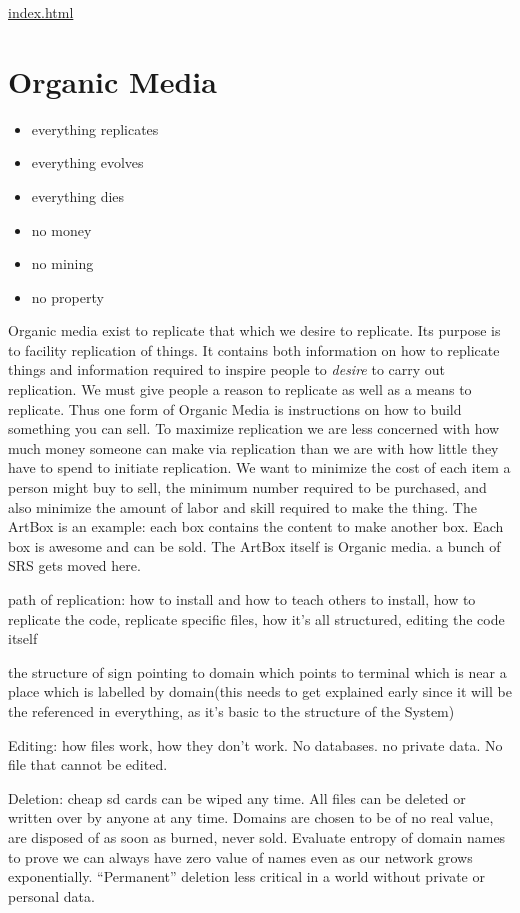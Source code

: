 \url{index.html}

\section{Organic Media}\label{organic-media}

\begin{itemize}
\item
  everything replicates
\item
  everything evolves
\item
  everything dies
\item
  no money
\item
  no mining
\item
  no property
\end{itemize}

Organic media exist to replicate that which we desire to replicate.  Its purpose is to facility replication of things.  It contains both information on how to replicate things and information required to inspire people to \emph{desire} to carry out replication.  We must give people a reason to replicate as well as a means to replicate.  Thus one form of Organic Media is instructions on how to build something you can sell.  To maximize replication we are less concerned with how much money someone can make via replication than we are with how little they have to spend to initiate replication.  We want to minimize the cost of each item a person might buy to sell, the minimum number required to be purchased, and also minimize the amount of labor and skill required to make the thing.  The ArtBox is an example: each box contains the content to make another box.  Each box is awesome and can be sold.  The ArtBox itself is Organic media.  a bunch of SRS gets moved here.


path of replication: how to install and how to teach others to install,
how to replicate the code, replicate specific files, how it's all
structured, editing the code itself

the structure of sign pointing to domain which points to terminal which
is near a place which is labelled by domain(this needs to get explained
early since it will be the referenced in everything, as it's basic to
the structure of the System)

Editing: how files work, how they don't work. No databases. no private
data. No file that cannot be edited.

Deletion: cheap sd cards can be wiped any time. All files can be deleted
or written over by anyone at any time. Domains are chosen to be of no
real value, are disposed of as soon as burned, never sold. Evaluate
entropy of domain names to prove we can always have zero value of names
even as our network grows exponentially. ``Permanent'' deletion less
critical in a world without private or personal data.

